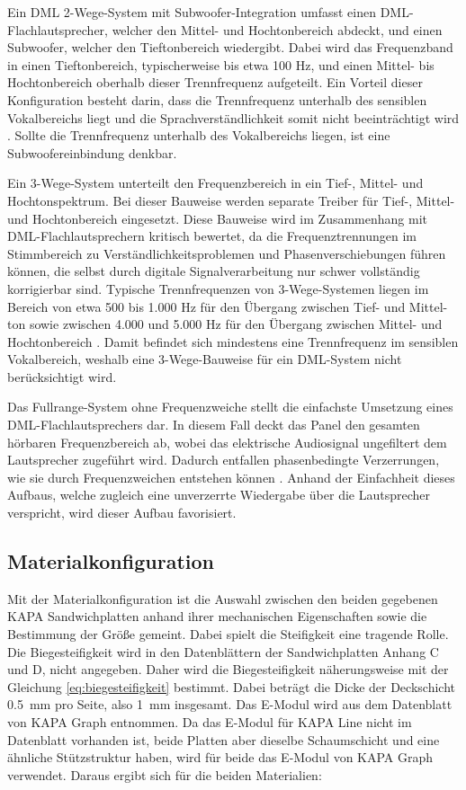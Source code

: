 Ein DML 2-Wege-System mit Subwoofer-Integration umfasst einen DML-Flachlautsprecher, welcher den Mittel- und Hochtonbereich abdeckt, und einen Subwoofer, welcher den Tieftonbereich wiedergibt. Dabei wird das Frequenzband in einen Tieftonbereich, typischerweise bis etwa 100 Hz, und einen Mittel- bis Hochtonbereich oberhalb dieser Trennfrequenz aufgeteilt. Ein Vorteil dieser Konfiguration besteht darin, dass die Trennfrequenz unterhalb des sensiblen Vokalbereichs liegt und die Sprachverständlichkeit somit nicht beeinträchtigt wird \cite{Weinzierl2025}. Sollte die Trennfrequenz unterhalb des Vokalbereichs liegen, ist eine Subwoofereinbindung denkbar.

Ein 3-Wege-System unterteilt den Frequenzbereich in ein Tief-, Mittel- und Hochtonspektrum. Bei dieser Bauweise werden separate Treiber für Tief-, Mittel- und Hochtonbereich eingesetzt. Diese Bauweise wird im Zusammenhang mit DML-Flachlautsprechern kritisch bewertet, da die Frequenztrennungen im Stimmbereich zu Verständlichkeitsproblemen und Phasenverschiebungen führen können, die selbst durch digitale Signalverarbeitung nur schwer vollständig korrigierbar sind. Typische Trennfrequenzen von 3-Wege-Systemen liegen im Bereich von etwa 500 bis 1.000 Hz für den Übergang zwischen Tief- und Mittel-ton sowie zwischen 4.000 und 5.000 Hz für den Übergang zwischen Mittel- und Hochtonbereich \cite{Weinzierl2025}. Damit befindet sich mindestens eine Trennfrequenz im sensiblen Vokalbereich, weshalb eine 3-Wege-Bauweise für ein DML-System nicht berücksichtigt wird.

Das Fullrange-System ohne Frequenzweiche stellt die einfachste Umsetzung eines DML-Flachlautsprechers dar. In diesem Fall deckt das Panel den gesamten hörbaren Frequenzbereich ab, wobei das elektrische Audiosignal ungefiltert dem Lautsprecher zugeführt wird. Dadurch entfallen phasenbedingte Verzerrungen, wie sie durch Frequenzweichen entstehen können \cite{Moeser2005}. Anhand der Einfachheit dieses Aufbaus, welche zugleich eine unverzerrte Wiedergabe über die Lautsprecher verspricht, wird dieser Aufbau favorisiert. 


\subsection{Materialkonfiguration}

Mit der Materialkonfiguration ist die Auswahl zwischen den beiden gegebenen KAPA Sandwichplatten anhand ihrer mechanischen Eigenschaften sowie die Bestimmung der Größe gemeint. Dabei spielt die Steifigkeit eine tragende Rolle. Die Biegesteifigkeit wird in den Datenblättern der Sandwichplatten Anhang C und D, nicht angegeben. Daher wird die Biegesteifigkeit näherungsweise mit der Gleichung \ref{eq:biegesteifigkeit} bestimmt. 
Dabei beträgt die Dicke der Deckschicht \SI{0,5}{\milli\meter} pro Seite, also \SI{1}{\milli\meter} insgesamt. Das E-Modul wird aus dem Datenblatt von KAPA Graph entnommen. 
Da das E-Modul für KAPA Line nicht im Datenblatt vorhanden ist, beide Platten aber dieselbe Schaumschicht und eine ähnliche Stützstruktur haben, wird für beide das E-Modul von KAPA Graph verwendet. Daraus ergibt sich für die beiden Materialien: 

